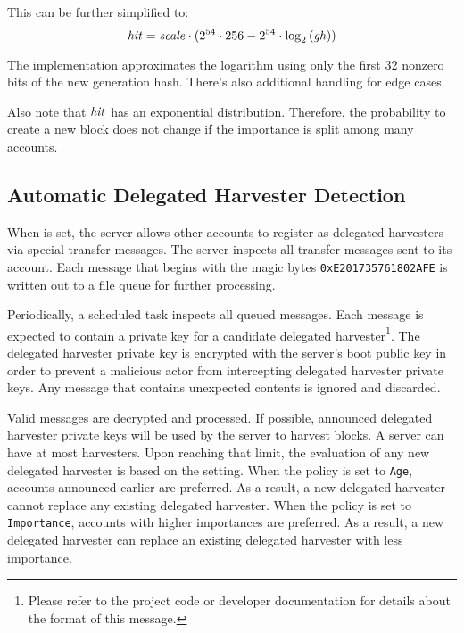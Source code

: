 This can be further simplified to:
$$
\mathit{hit} =  \mathit{scale} \cdot ( 2^{54} \cdot 256 -  2^{54} \cdot \log_2\left(\mathit{gh}\right))
$$

The implementation approximates the logarithm using only the first 32 nonzero bits of the new generation hash.
There's also additional handling for edge cases.

Also note that $\mathit{hit}$ has an exponential distribution. Therefore, the probability to create a new block does not change if the importance is split among many accounts.

\subsection{Automatic Delegated Harvester Detection}

When  is set, the server allows other accounts to register as delegated harvesters via special transfer messages.
The server inspects all transfer messages sent to its  account.
Each message that begins with the magic bytes \texttt{0xE201735761802AFE} is written out to a file queue for further processing.

Periodically, a scheduled task inspects all queued messages.
Each message is expected to contain a private key for a candidate delegated harvester\footnote{
Please refer to the project code or developer documentation for details about the format of this message.}.
The delegated harvester private key is encrypted with the server's boot public key in order to prevent a malicious actor from intercepting delegated harvester private keys.
Any message that contains unexpected contents is ignored and discarded.

Valid messages are decrypted and processed.
If possible, announced delegated harvester private keys will be used by the server to harvest blocks.
A server can have at most  harvesters.
Upon reaching that limit, the evaluation of any new delegated harvester is based on the  setting.
When the policy is set to \texttt{Age}, accounts announced earlier are preferred.
As a result, a new delegated harvester cannot replace any existing delegated harvester.
When the policy is set to \texttt{Importance}, accounts with higher importances are preferred.
As a result, a new delegated harvester can replace an existing delegated harvester with less importance.

